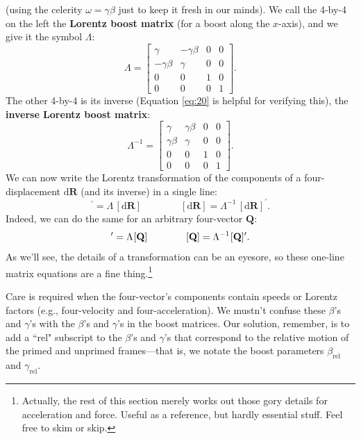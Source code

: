 \documentclass[12pt]{article}
\renewcommand{\vv}[1]{\mathbf{#1}}
\newcommand{\dd}[1]{\mathrm{d}#1}
\begin{document}
(using the celerity $\omega = \gamma \beta$ just to keep it fresh in our minds). We call the 4-by-4 on the left the \textbf{Lorentz boost matrix} (for a boost along the $x$-axis), and we give it the symbol $\Lambda$:
\begin{equation}\label{eq:bm}
\Lambda =
\begin{bmatrix}
\gamma & -\gamma \beta & 0 & 0 \\
- \gamma \beta & \gamma & 0 & 0 \\
0 & 0 & 1 & 0 \\
0 & 0 & 0 & 1
\end{bmatrix} .
\end{equation}
The other 4-by-4 is its inverse (Equation \ref{eq:20} is helpful for verifying this), the \textbf{inverse Lorentz boost matrix}:
\begin{equation}\label{eq:im}
\Lambda^{-1} =
\begin{bmatrix}
\gamma & \gamma \beta & 0 & 0 \\
\gamma \beta & \gamma & 0 & 0 \\
0 & 0 & 1 & 0 \\
0 & 0 & 0 & 1
\end{bmatrix} .
\end{equation}
We can now write the Lorentz transformation of the components of a four-displacement $\dd \vv R$ (and its inverse) in a single line:
\begin{equation*}
[\dd \vv R]^\prime = \Lambda \, [\dd \vv R] \qquad \qquad [\dd \vv R] = \Lambda^{-1} \, [\dd \vv R]^\prime .
\end{equation*}
Indeed, we can do the same for an arbitrary four-vector $\vv Q$:
\begin{equation*}
[\vv Q]^\prime = \Lambda \mkern1mu [\vv Q] \qquad \qquad [\vv Q] = \Lambda^{-1} \mkern1mu [\vv Q]^\prime .
\end{equation*}
As we'll see, the details of a transformation can be an eyesore, so these one-line matrix equations are a fine thing.\footnote{Actually, the rest of this section merely works out those gory details for acceleration and force. Useful as a reference, but hardly essential stuff. Feel free to skim or skip.}

Care is required when the four-vector's components contain speeds or Lorentz factors (e.g., four-velocity and four-acceleration). We mustn't confuse these $\beta$'s and $\gamma$'s with the $\beta$'s and $\gamma$'s in the boost matrices. Our solution, remember, is to add a ``rel" subscript to the $\beta$'s and $\gamma$'s that correspond to the relative motion of the primed and unprimed frames---that is, we notate the boost parameters $\beta_{\mathrm{rel}}$ and $\gamma_{\mathrm{rel}}$.
\end{document}
